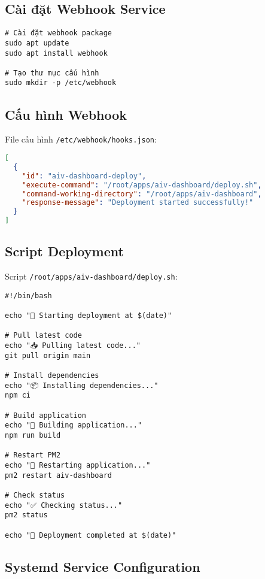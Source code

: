 \documentclass[12pt,a4paper]{article}
\begin{document}
\subsection{Cài đặt Webhook Service}

\begin{lstlisting}[caption=Cài đặt webhook package]
# Cài đặt webhook package
sudo apt update
sudo apt install webhook

# Tạo thư mục cấu hình
sudo mkdir -p /etc/webhook
\end{lstlisting}

\subsection{Cấu hình Webhook}

File cấu hình \texttt{/etc/webhook/hooks.json}:

\begin{lstlisting}[caption=Cấu hình webhook hooks.json, language=json]
[
  {
    "id": "aiv-dashboard-deploy",
    "execute-command": "/root/apps/aiv-dashboard/deploy.sh",
    "command-working-directory": "/root/apps/aiv-dashboard",
    "response-message": "Deployment started successfully!"
  }
]
\end{lstlisting}

\subsection{Script Deployment}

Script \texttt{/root/apps/aiv-dashboard/deploy.sh}:

\begin{lstlisting}[caption=Script deployment tự động]
#!/bin/bash

echo "🚀 Starting deployment at $(date)"

# Pull latest code
echo "📥 Pulling latest code..."
git pull origin main

# Install dependencies
echo "📦 Installing dependencies..."
npm ci

# Build application
echo "🔨 Building application..."
npm run build

# Restart PM2
echo "🔄 Restarting application..."
pm2 restart aiv-dashboard

# Check status
echo "✅ Checking status..."
pm2 status

echo "🎉 Deployment completed at $(date)"
\end{lstlisting}

\subsection{Systemd Service Configuration}
\end{document}
